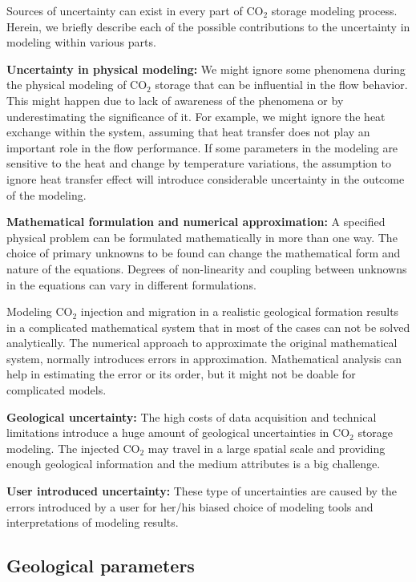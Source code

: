 Sources of uncertainty can exist in every part of $\mbox{CO}_2$ storage modeling
process. Herein, we briefly describe each of the possible contributions to the
uncertainty in modeling within various parts.

\textbf{Uncertainty in physical modeling:} We might ignore some phenomena during
the physical modeling of $\mbox{CO}_2$ storage that can be influential in the
flow behavior. This might happen due to lack of awareness of the phenomena or by
underestimating the significance of it. For
example, we might ignore the heat exchange within the system, assuming that heat
transfer does not play an important role in the flow performance. If some
parameters in the modeling are sensitive to the heat and change by temperature
variations,
the assumption to ignore heat transfer effect will introduce considerable
uncertainty in
the outcome of the modeling.

\textbf{Mathematical formulation and numerical approximation:} A specified
physical problem can be formulated mathematically in more than one way. The
choice of primary unknowns to be found can change the mathematical form and
nature of the equations. Degrees of non-linearity and coupling between unknowns
in the equations can vary in different formulations. 

Modeling $\mbox{CO}_2$ injection and migration in a realistic geological
formation results in a complicated mathematical system that in most of the cases
can not be solved analytically. The numerical approach to approximate the
original mathematical system, normally introduces errors in approximation.
Mathematical analysis can help in estimating the error or its order, but it
might not be doable for complicated models.

\textbf{Geological uncertainty:} The high costs of data acquisition and
technical
limitations introduce a huge amount of geological uncertainties in $\mbox{CO}_2$
storage modeling. The injected $\mbox{CO}_2$ may travel in a large spatial scale
and providing enough geological information and the medium attributes is a big
challenge.

\textbf{User introduced uncertainty:} These type of uncertainties are caused by
the errors introduced by a user for her/his biased choice of modeling tools and
interpretations of modeling results. 


\subsection{Geological parameters}


